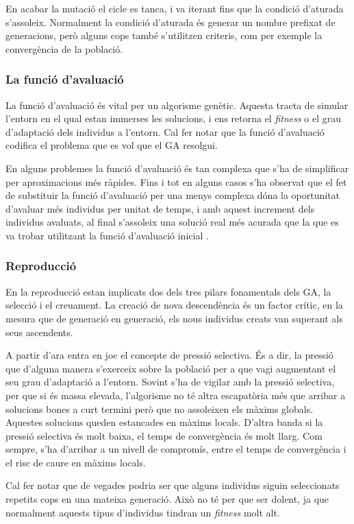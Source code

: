 En acabar la mutació el cicle es tanca, i va iterant fins que la condició
d'aturada s'assoleix. Normalment la condició d'aturada és generar un nombre
prefixat de generacions, però alguns cops també s'utilitzen criteris, com per
exemple la convergència de la població.

\subsubsection{La funció d'avaluació\label{subsec:avaluacio}} La funció
d'avaluació és vital per un algorisme genètic. Aquesta tracta de simular
l'entorn en el qual estan immerses les solucions, i ens retorna el
\emph{fitness} o el grau d'adaptació dels individus a l'entorn. Cal fer notar
que la funció d'avaluació codifica el problema que es vol que el GA resolgui.

En alguns problemes la funció d'avaluació és tan complexa que s'ha de
simplificar per aproximacions més ràpides. Fins i tot en alguns casos s'ha
observat que el fet de substituir la funció d'avaluació per una menys complexa
dóna la oportunitat d'avaluar més individus per unitat de temps, i amb aquest
increment dels individus avaluats, al final s'assoleix una solució real més
acurada que la que es va trobar utilitzant la funció d'avaluació inicial
\cite{G89}. 

\subsubsection{Reproducció} En la reproducció estan implicats dos dels tres
pilars fonamentals dels GA, la selecció i el creuament. La creació de nova
descendència és un factor crític, en la mesura que de generació en generació,
els nous individus creats van superant als seus ascendents.

A partir d'ara entra en joc el concepte de pressió selectiva. És a dir, la
pressió que d'alguna manera s'exerceix sobre la població per a que vagi
augmentant el seu grau d'adaptació a l'entorn. Sovint s'ha de vigilar amb la
pressió selectiva, per que si és massa elevada, l'algorisme no té altra
escapatòria més que arribar a solucions bones a curt termini però que no
assoleixen els màxims globals. Aquestes solucions queden estancades en màxims
locals. D'altra banda si la pressió selectiva és molt baixa, el temps de
convergència és molt llarg.  Com sempre, s'ha d'arribar a un nivell de
compromís, entre el temps de convergència i el risc de caure en màxims locals.

Cal fer notar que de vegades podria ser que alguns individus siguin seleccionats
repetits cops en una mateixa generació. Això no té per que ser dolent, ja que
normalment aquests tipus d'individus tindran un \emph{fitness} molt alt.

